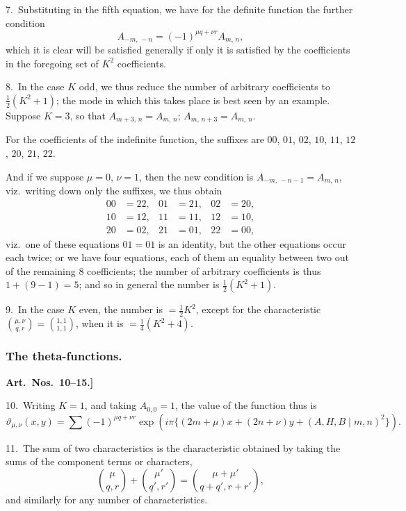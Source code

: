\documentclass[11pt,a4paper]{book}
\begin{document}
7.\ Substituting in the fifth equation, we have for the definite function the further condition
\[
A_{-m,\,-n} = (-1)^{\mu q + \nu r}A_{m,\,n},
\]
which it is clear will be satisfied generally if only it is satisfied by the coefficients in the foregoing set of $K^2$ coefficients.

\medskip

8.\ In the case $K$ odd, we thus reduce the number of arbitrary coefficients to $\frac{1}{2}(K^2 + 1)$; the mode in which this takes place is best seen by an example. Suppose $K = 3$, so that $A_{m+3,\,n} = A_{m,\,n}$; $A_{m,\,n+3} = A_{m,\,n}$.

For the coefficients of the indefinite function, the suffixes are $00$, $01$, $02$, $10$, $11$, $12$, $20$, $21$, $22$.

And if we suppose $\mu = 0$, $\nu = 1$, then the new condition is $A_{-m,\,-n-1} = A_{m,\,n}$, viz.\ writing down only the suffixes, we thus obtain
\begin{align*}
00 &= 22, & 01 &= 21, & 02 &= 20,\\
10 &= 12, & 11 &= 11, & 12 &= 10,\\
20 &= 02, & 21 &= 01, & 22 &= 00,
\end{align*}
viz.\ one of these equations $01 = 01$ is an identity, but the other equations occur each twice; or we have four equations, each of them an equality between two out of the remaining 8 coefficients; the number of arbitrary coefficients is thus $1 + (9 - 1) = 5$; and so in general the number is $\frac{1}{2}(K^2 + 1)$.

\medskip

9.\ In the case $K$ even, the number is $= \frac{1}{2}K^2$, except for the characteristic $\binom{\mu, \nu}{q, r} = \binom{1, 1}{1, 1}$, when it is $= \frac{1}{4}(K^2 + 4)$.

\subsubsection*{The theta-functions.}

\textbf{Art.~Nos.~10--15.]
}

10.\ Writing $K = 1$, and taking $A_{0,0} = 1$, the value of the function thus is
\[
\vartheta_{\mu,\nu}(x, y) = \sum (-1)^{\mu q + \nu r}\exp(i\pi\{(2m + \mu)x + (2n + \nu)y + (A, H, B \mid m, n)^2\}).
\]

\medskip

11.\ The sum of two characteristics is the characteristic obtained by taking the sums of the component terms or characters,
\[
\binom{\mu}{q, r} + \binom{\mu'}{q', r'} = \binom{\mu + \mu'}{q + q', r + r'},
\]
and similarly for any number of characteristics.
\end{document}
